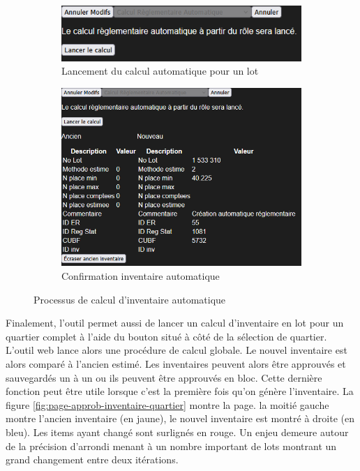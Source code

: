 \begin{figure}[h]
    \centering
    \begin{subfigure}[c]{0.4\textwidth}
        \includegraphics[width=1\linewidth,center]{images/ReglementaireRole.png}
        \caption{Lancement du calcul automatique pour un lot}
        \label{fig:modif-inventaire-auto}
    \end{subfigure}
    \begin{subfigure}[c]{0.4\textwidth}
        \includegraphics[width=1\linewidth,center]{images/ResultatModifAutomatique.png}
        \caption{Confirmation inventaire automatique}
        \label{fig:conf-inv-auto}
    \end{subfigure}
    \caption{Processus de calcul d'inventaire automatique}
    \label{fig:modif-inventaire-auto-nonsub}
\end{figure}
Finalement, l'outil permet aussi de lancer un calcul d'inventaire en lot pour un quartier complet à l'aide du bouton situé à côté de la sélection de quartier. L'outil web lance alors une procédure de calcul globale. Le nouvel inventaire est alors comparé à l'ancien estimé. Les inventaires peuvent alors être approuvés et sauvegardés un à un ou ils peuvent être approuvés en bloc. Cette dernière fonction peut être utile lorsque c'est la première fois qu'on génère l'inventaire. La figure \ref{fig:page-approb-inventaire-quartier} montre la page. la moitié gauche  montre l'ancien inventaire (en jaune), le nouvel inventaire est montré à droite (en bleu). Les items ayant changé sont surlignés en rouge. Un enjeu demeure autour de la précision d'arrondi menant à un nombre important de lots montrant un grand changement entre deux itérations.
